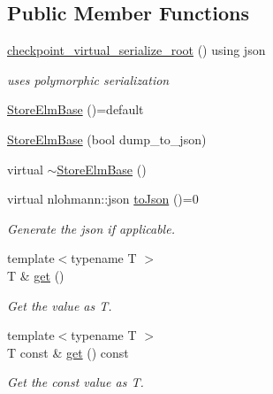 \subsection*{Public Member Functions}
\begin{DoxyCompactItemize}
\item 
\hyperlink{structvt_1_1vrt_1_1collection_1_1storage_1_1_store_elm_base_ace4bb0073e5de18f3743ca10c31fdf2d}{checkpoint\+\_\+virtual\+\_\+serialize\+\_\+root} () using json
\begin{DoxyCompactList}\small\item\em uses polymorphic serialization \end{DoxyCompactList}\item 
\hyperlink{structvt_1_1vrt_1_1collection_1_1storage_1_1_store_elm_base_a7fa798418159b33d18f1b4a687c727c1}{Store\+Elm\+Base} ()=default
\item 
\hyperlink{structvt_1_1vrt_1_1collection_1_1storage_1_1_store_elm_base_a7eb48bee712612a702745f3abdfa72ed}{Store\+Elm\+Base} (bool dump\+\_\+to\+\_\+json)
\item 
virtual \hyperlink{structvt_1_1vrt_1_1collection_1_1storage_1_1_store_elm_base_a564f20122fff98f72f65752ce610f05e}{$\sim$\+Store\+Elm\+Base} ()
\item 
virtual nlohmann\+::json \hyperlink{structvt_1_1vrt_1_1collection_1_1storage_1_1_store_elm_base_a3c207bb3612dba2db9fef7e0e7f2e717}{to\+Json} ()=0
\begin{DoxyCompactList}\small\item\em Generate the json if applicable. \end{DoxyCompactList}\item 
{\footnotesize template$<$typename T $>$ }\\T \& \hyperlink{structvt_1_1vrt_1_1collection_1_1storage_1_1_store_elm_base_aa20aab1f18c5c993151f556d03296441}{get} ()
\begin{DoxyCompactList}\small\item\em Get the value as {\ttfamily T}. \end{DoxyCompactList}\item 
{\footnotesize template$<$typename T $>$ }\\T const  \& \hyperlink{structvt_1_1vrt_1_1collection_1_1storage_1_1_store_elm_base_aee7baa6c42334cd792c76888cd07cc18}{get} () const
\begin{DoxyCompactList}\small\item\em Get the const value as {\ttfamily T}. \end{DoxyCompactList}\item 

\end{DoxyCompactItemize}
